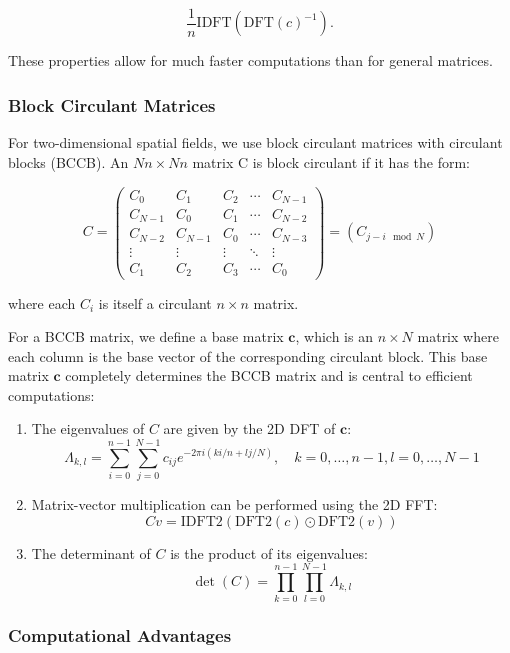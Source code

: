 \documentclass[journal=,manuscript=]{achemso}
\begin{document}
\[
\frac1n \text{IDFT}(\text{DFT}(c)^{-1}).
\]

These properties allow for much faster computations than for general
matrices.

\subsubsection{Block Circulant Matrices}\label{block-circulant-matrices}

For two-dimensional spatial fields, we use block circulant matrices with
circulant blocks (BCCB). An \(Nn \times Nn\) matrix C is block circulant
if it has the form:

\[
C = \begin{pmatrix}
C_0 & C_1 & C_2 & \cdots & C_{N-1} \\
C_{N-1} & C_0 & C_1 & \cdots & C_{N-2} \\
C_{N-2} & C_{N-1} & C_0 & \cdots & C_{N-3} \\
\vdots & \vdots & \vdots & \ddots & \vdots \\
C_1 & C_2 & C_3 & \cdots & C_0
\end{pmatrix} = (C_{j-i \mod N})
\]

where each \(C_i\) is itself a circulant \(n \times n\) matrix.

For a BCCB matrix, we define a base matrix \(\mathbf c\), which is an
\(n \times N\) matrix where each column is the base vector of the
corresponding circulant block. This base matrix \(\mathbf c\) completely
determines the BCCB matrix and is central to efficient computations:

\begin{enumerate}
\def\labelenumi{\arabic{enumi}.}
\item
  The eigenvalues of \(C\) are given by the 2D DFT of \(\mathbf c\): \[
  \Lambda_{k,l} = \sum_{i=0}^{n-1} \sum_{j=0}^{N-1} c_{ij} e^{-2\pi i (ki/n + lj/N)}, \quad k = 0, \dots, n-1, l = 0, \dots, N-1
  \]
\item
  Matrix-vector multiplication can be performed using the 2D FFT: \[
  Cv = \text{IDFT2}(\text{DFT2}(c) \odot \text{DFT2}(v))
  \]
\item
  The determinant of \(C\) is the product of its eigenvalues: \[
  \det(C) = \prod_{k=0}^{n-1} \prod_{l=0}^{N-1} \Lambda_{k,l}
  \]
\end{enumerate}

\subsubsection{Computational Advantages}\label{computational-advantages}
\end{document}
